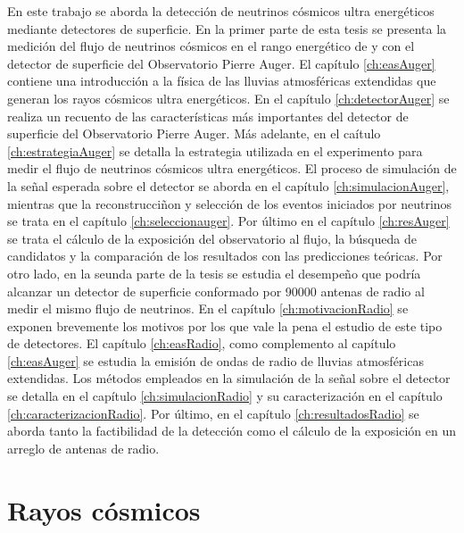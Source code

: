 En este trabajo se aborda la detecci\'on de neutrinos c\'osmicos ultra energ\'eticos mediante detectores de superficie.
En la primer parte de esta tesis se presenta la medici\'on del flujo de neutrinos c\'osmicos en el rango energ\'etico de  y  con el detector de superficie del Observatorio Pierre Auger.
El cap\'itulo \ref{ch:easAuger} contiene una introducci\'on a la f\'isica de las lluvias atmosf\'ericas extendidas que generan los rayos c\'osmicos ultra energ\'eticos. 
En el cap\'itulo \ref{ch:detectorAuger} se realiza un recuento de las caracter\'isticas m\'as importantes del detector de superficie del Observatorio Pierre Auger.
M\'as adelante, en el ca\'itulo \ref{ch:estrategiaAuger} se detalla la estrategia utilizada en el experimento para medir el flujo de neutrinos c\'osmicos ultra energ\'eticos.
El proceso de simulaci\'on de la se\~nal esperada sobre el detector se aborda en el cap\'itulo \ref{ch:simulacionAuger}, mientras que la reconstrucci\~non y selecci\'on de los eventos iniciados por neutrinos se trata en el cap\'itulo \ref{ch:seleccionauger}.
Por \'ultimo en el cap\'itulo \ref{ch:resAuger} se trata el c\'alculo de la exposici\'on del observatorio al flujo, la b\'usqueda de candidatos y la comparaci\'on de los resultados con las predicciones te\'oricas.
Por otro lado, en la seunda parte de la tesis se estudia el desempe\~no que podr\'ia alcanzar un detector de superficie conformado por 90000 antenas de radio al medir el mismo flujo de neutrinos.
En el cap\'itulo \ref{ch:motivacionRadio} se exponen brevemente los motivos por los que vale la pena el estudio de este tipo de detectores.
El cap\'itulo \ref{ch:easRadio}, como complemento al cap\'itulo \ref{ch:easAuger} se estudia la emisi\'on de ondas de radio de lluvias atmosf\'ericas extendidas.
Los m\'etodos empleados en la simulaci\'on de la se\~nal sobre el detector se detalla en el cap\'itulo \ref{ch:simulacionRadio} y su caracterizaci\'on en el cap\'itulo \ref{ch:caracterizacionRadio}.
Por \'ultimo, en el cap\'itulo \ref{ch:resultadosRadio} se aborda tanto la factibilidad de la detecci\'on como el c\'alculo de la exposici\'on en un arreglo de antenas de radio.


\section{Rayos c\'osmicos}


